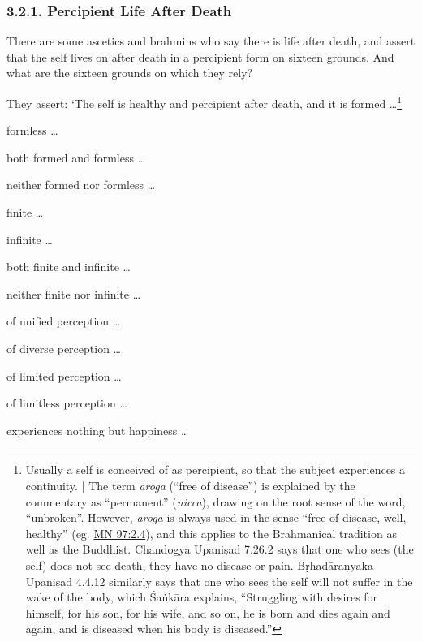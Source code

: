 \documentclass[12pt,openany]{book}%
\begin{document}
\subsubsection*{3.2.1. Percipient Life After Death }

There are some ascetics and brahmins who say there is life after death, and assert that the self lives on after death in a percipient form on sixteen grounds. And what are the sixteen grounds on which they rely? 

They assert: ‘The self is healthy and percipient after death, and it is formed …\footnote{Usually a self is conceived of as percipient, so that the subject experiences a continuity. | The term \textit{aroga} (“free of disease”) is explained by the commentary as “permanent” (\textit{nicca}), drawing on the root sense of the word, “unbroken”. However, \textit{aroga} is always used in the sense “free of disease, well, healthy” (eg. \href{https://suttacentral.net/mn97/en/sujato\#2.4}{MN 97:2.4}), and this applies to the Brahmanical tradition as well as the Buddhist. Chandogya \textsanskrit{Upaniṣad} 7.26.2 says that one who sees (the self) does not see death, they have no disease or pain. \textsanskrit{Bṛhadāraṇyaka} \textsanskrit{Upaniṣad} 4.4.12 similarly says that one who sees the self will not suffer in the wake of the body, which \textsanskrit{Śaṅkāra} explains, “Struggling with desires for himself, for his son, for his wife, and so on, he is born and dies again and again, and is diseased when his body is diseased.” } 

formless … 

both formed and formless … 

neither formed nor formless … 

finite … 

infinite … 

both finite and infinite … 

neither finite nor infinite … 

of unified perception … 

of diverse perception … 

of limited perception … 

of limitless perception … 

experiences nothing but happiness … 
\end{document}
